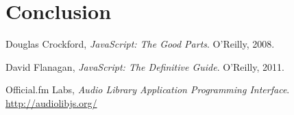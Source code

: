 \documentclass[12pt,a4paper]{article}
\begin{document}
\section{Conclusion}

\pagebreak

\begin{thebibliography}{99}

	Douglas Crockford,
	\emph{JavaScript: The Good Parts}.
	O'Reilly, 2008.

\medskip

	David Flanagan,
	\emph{JavaScript: The Definitive Guide}.
	O'Reilly, 2011.

\medskip

	Official.fm Labs,
	\emph{Audio Library Application Programming Interface}.\\
	\url{http://audiolibjs.org/}

\end{thebibliography}

\appendix
\end{document}
